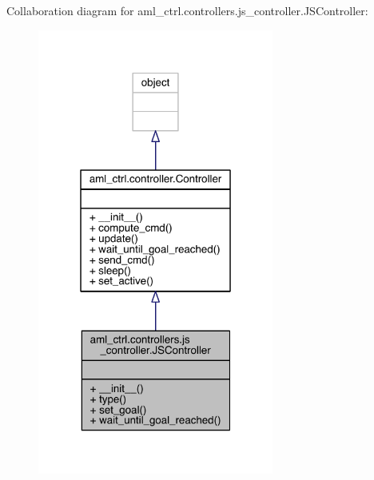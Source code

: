 Collaboration diagram for aml\+\_\+ctrl.\+controllers.\+js\+\_\+controller.\+J\+S\+Controller\+:\nopagebreak
\begin{figure}[H]
\begin{center}
\leavevmode
\includegraphics[width=220pt]{classaml__ctrl_1_1controllers_1_1js__controller_1_1_j_s_controller__coll__graph}
\end{center}
\end{figure}
